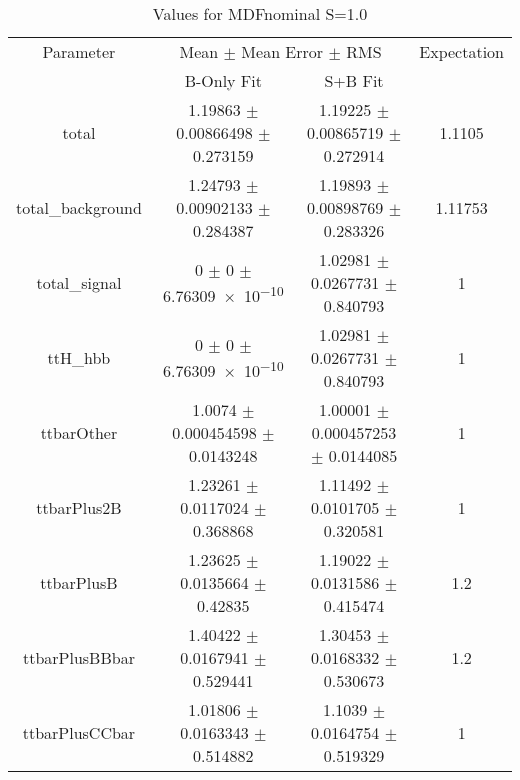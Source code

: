 \begin{table}
\centering
\caption{Values for MDFnominal S=1.0}
\begin{tabular}{cccc}
\toprule
Parameter & \multicolumn{2}{c}{Mean $\pm$ Mean Error $\pm$ RMS} & Expectation\\
 & B-Only Fit & S+B Fit & \\
\midrule
total & \num{1.19863} $\pm$ \num{0.00866498} $\pm$ \num{0.273159} & \num{1.19225} $\pm$ \num{0.00865719} $\pm$ \num{0.272914} & \num{1.1105}\\
total\_background & \num{1.24793} $\pm$ \num{0.00902133} $\pm$ \num{0.284387} & \num{1.19893} $\pm$ \num{0.00898769} $\pm$ \num{0.283326} & \num{1.11753}\\
total\_signal & \num{0} $\pm$ \num{0} $\pm$ \num{6.76309e-10} & \num{1.02981} $\pm$ \num{0.0267731} $\pm$ \num{0.840793} & \num{1}\\
ttH\_hbb & \num{0} $\pm$ \num{0} $\pm$ \num{6.76309e-10} & \num{1.02981} $\pm$ \num{0.0267731} $\pm$ \num{0.840793} & \num{1}\\
ttbarOther & \num{1.0074} $\pm$ \num{0.000454598} $\pm$ \num{0.0143248} & \num{1.00001} $\pm$ \num{0.000457253} $\pm$ \num{0.0144085} & \num{1}\\
ttbarPlus2B & \num{1.23261} $\pm$ \num{0.0117024} $\pm$ \num{0.368868} & \num{1.11492} $\pm$ \num{0.0101705} $\pm$ \num{0.320581} & \num{1}\\
ttbarPlusB & \num{1.23625} $\pm$ \num{0.0135664} $\pm$ \num{0.42835} & \num{1.19022} $\pm$ \num{0.0131586} $\pm$ \num{0.415474} & \num{1.2}\\
ttbarPlusBBbar & \num{1.40422} $\pm$ \num{0.0167941} $\pm$ \num{0.529441} & \num{1.30453} $\pm$ \num{0.0168332} $\pm$ \num{0.530673} & \num{1.2}\\
ttbarPlusCCbar & \num{1.01806} $\pm$ \num{0.0163343} $\pm$ \num{0.514882} & \num{1.1039} $\pm$ \num{0.0164754} $\pm$ \num{0.519329} & \num{1}\\
\bottomrule
\end{tabular}
\end{table}